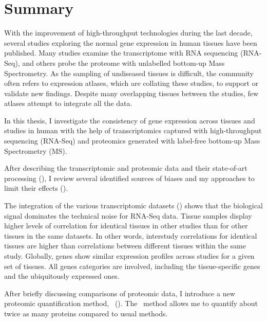 \clearpage
\chapter*{Summary}\label{ch:summary}
\vspace{-1cm}
\begin{singlespace}
    {\small With the improvement of high-throughput technologies
    during the last decade,
    several studies exploring the normal gene expression in human tissues
    have been published.
    Many studies examine the transcriptome with RNA sequencing (RNA-Seq),
    and others probe the proteome with unlabelled bottom-up Mass Spectrometry.
    As the sampling of undiseased tissues is difficult,
    the community often refers to expression atlases,
    which are collating these studies,
    to support or validate new findings.
    Despite many overlapping tissues between the studies,
    few atlases attempt to integrate all the data.\mybr\

    In this thesis, I investigate the consistency of gene expression
    across tissues and studies in human
    with the help of transcriptomics
    captured with high-throughput sequencing (RNA-Seq)
    and proteomics generated with label-free bottom-up
    Mass Spectrometry (MS).\mybr\

    After describing the transcriptomic and proteomic data
    and their state-of-art processing (),
    I review several identified sources of biases
    and my approaches to limit their effects ().\mybr\

    The integration of the various transcriptomic datasets
    ()
    shows that
    the biological signal dominates the technical noise for RNA-Seq data.
    Tissue samples display higher levels of correlation
    for identical tissues in other studies than
    for other tissues in the same datasets.
    In other words, interstudy correlations for identical tissues
    are higher than correlations between different tissues within the same study.
    Globally, genes show similar expression profiles across studies
    for a given set of tissues.
    All genes categories are involved, including the tissue-specific genes
    and the ubiquitously expressed ones.\mybr\

    After briefly discussing comparisons of proteomic data,
    I introduce a new proteomic quantification method,
    \PPKM\ ().
    The \PPKM\ method allows me to quantify about twice as many proteins
    compared to usual methods.\mybr\

}
\end{singlespace}
